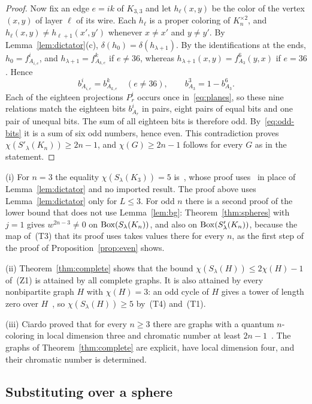 \begin{proof}
Now fix an edge $e=ik$ of $K_{3,3}$ and let $h_\ell(x,y)$ be the color of the vertex $(x,y)$ of layer $\ell$ of its wire. Each $h_\ell$ is a proper coloring of $K_n^{\times2}$, and $h_\ell(x,y)\ne h_{\ell+1}(x',y')$ whenever $x\ne x'$ and $y\ne y'$. By Lemma~\ref{lem:dictator}(c), $\delta(h_0)=\delta(h_{\lambda+1})$. By the identifications at the ends, $h_0=f^i_{A_{i,e}}$, and $h_{\lambda+1}=f^k_{A_{k,e}}$ if $e\ne36$, whereas $h_{\lambda+1}(x,y)=f^6_{A_3}(y,x)$ if $e=36$. Hence
\[
 b^i_{A_{i,e}}=b^k_{A_{k,e}}\quad(e\ne36),\qquad b^3_{A_3}=1-b^6_{A_3} .
\]
Each of the eighteen projections $P^i_r$ occurs once in~\eqref{eq:planes}, so these nine relations match the eighteen bits $b^i_{A_r}$ in pairs, eight pairs of equal bits and one pair of unequal bits. The sum of all eighteen bits is therefore odd. By~\eqref{eq:odd-bits} it is a sum of six odd numbers, hence even. This contradiction proves $\chi(S'_\lambda(K_n))\ge2n-1$, and $\chi(G)\ge2n-1$ follows for every $G$ as in the statement.
\end{proof}

\begin{remark}\label{rem:complete}
(i) For $n=3$ the equality $\chi(S_\lambda(K_3))=5$ is~\cite[Theorem~2.4]{Z}, whose proof uses~\cite[Lemma~2.3]{Z} in place of Lemma~\ref{lem:dictator} and no imported result. The proof above uses Lemma~\ref{lem:dictator} only for $L\le3$. For odd $n$ there is a second proof of the lower bound that does not use Lemma~\ref{lem:bg}: Theorem~\ref{thm:spheres} with $j=1$ gives $w^{2n-3}\ne0$ on $\operatorname{Box}(S_\lambda(K_n))$, and also on $\operatorname{Box}(S'_\lambda(K_n))$, because the map of~(T3) that its proof uses takes values there for every $n$, as the first step of the proof of Proposition~\ref{prop:even} shows.

(ii) Theorem~\ref{thm:complete} shows that the bound $\chi(S_\lambda(H))\le2\chi(H)-1$ of~(Z1) is attained by all complete graphs. It is also attained by every nonbipartite graph $H$ with $\chi(H)=3$: an odd cycle of $H$ gives a tower of length zero over $H$~\cite[proof of Theorem~7.1]{Z}, so $\chi(S_\lambda(H))\ge5$ by~(T4) and~(T1).

(iii) Ciardo proved that for every $n\ge3$ there are graphs with a quantum $n$-coloring in local dimension three and chromatic number at least $2n-1$~\cite[Corollary~35 and Example~36]{Ciardo24}. The graphs of Theorem~\ref{thm:complete} are explicit, have local dimension four, and their chromatic number is determined.
\end{remark}

\subsection{Substituting over a sphere}\label{sec:spheres}

